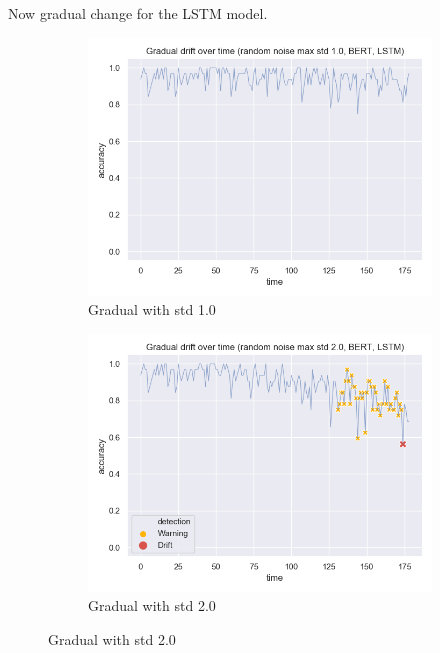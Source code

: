 \documentclass[12pt]{extreport}
\begin{document}
Now gradual change for the LSTM model.

\begin{figure}[H]
\centering
\begin{subfigure}{.5\textwidth}
  \centering
  \includegraphics[width=\linewidth]{assets/detecting-change/gradual_noise_random_std_1_lstm_wos_1_BERT.png}
  \caption{Gradual with std 1.0}
  \label{fig:lstm-gradual-std-1}
\end{subfigure}%
\begin{subfigure}{.5\textwidth}
  \centering
  \includegraphics[width=\linewidth]{assets/detecting-change/gradual_noise_random_std_2_lstm_wos_1_BERT.png}
  \caption{Gradual with std 2.0}
  \label{fig:lstm-gradual-std-2}
\end{subfigure}

\end{figure}
\end{document}
